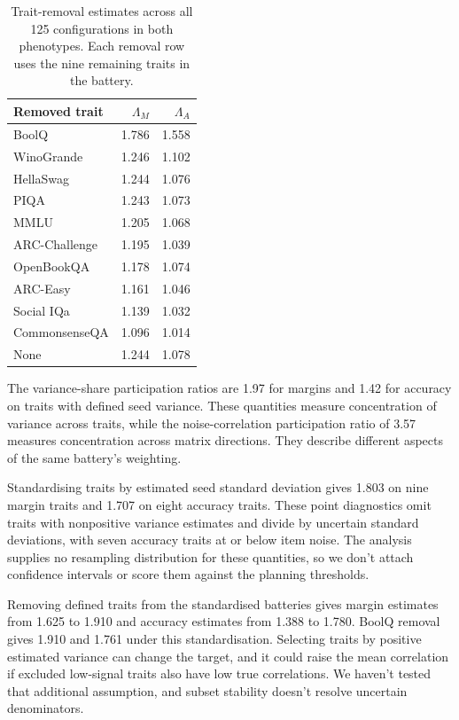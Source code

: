 \begin{table}[!htb]
\centering
\caption{Trait-removal estimates across all 125 configurations in both phenotypes. Each removal row uses the nine remaining traits in the battery.}
\label{tab:original10}
\small\setlength{\tabcolsep}{4pt}\renewcommand{\arraystretch}{1.12}
\begin{tabular}{lrr}\toprule
Removed trait & $\Lambda_M$ & $\Lambda_A$\\\midrule
BoolQ & 1.786 & 1.558\\
WinoGrande & 1.246 & 1.102\\
HellaSwag & 1.244 & 1.076\\
PIQA & 1.243 & 1.073\\
MMLU & 1.205 & 1.068\\
ARC-Challenge & 1.195 & 1.039\\
OpenBookQA & 1.178 & 1.074\\
ARC-Easy & 1.161 & 1.046\\
Social IQa & 1.139 & 1.032\\
CommonsenseQA & 1.096 & 1.014\\
None & 1.244 & 1.078\\\bottomrule
\end{tabular}
\end{table}

The variance-share participation ratios are 1.97 for margins and 1.42 for accuracy on traits with defined seed variance. These quantities measure concentration of variance across traits, while the noise-correlation participation ratio of 3.57 measures concentration across matrix directions. They describe different aspects of the same battery's weighting.

Standardising traits by estimated seed standard deviation gives 1.803 on nine margin traits and 1.707 on eight accuracy traits. These point diagnostics omit traits with nonpositive variance estimates and divide by uncertain standard deviations, with seven accuracy traits at or below item noise. The analysis supplies no resampling distribution for these quantities, so we don't attach confidence intervals or score them against the planning thresholds.

Removing defined traits from the standardised batteries gives margin estimates from 1.625 to 1.910 and accuracy estimates from 1.388 to 1.780. BoolQ removal gives 1.910 and 1.761 under this standardisation. Selecting traits by positive estimated variance can change the target, and it could raise the mean correlation if excluded low-signal traits also have low true correlations. We haven't tested that additional assumption, and subset stability doesn't resolve uncertain denominators.

